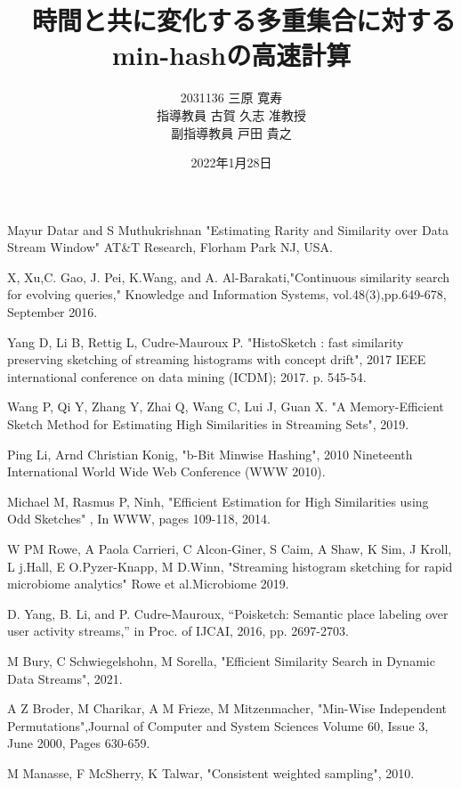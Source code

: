 \documentclass[a4paper,12pt,oneside,openany,dvipdfmx,report]{jsbook}
\title{\huge　時間と共に変化する多重集合に対するmin-hashの高速計算}
\author{2031136 三原 寛寿\\ 指導教員 古賀 久志 准教授\\  副指導教員  戸田 貴之}
\date{2022年1月28日}
\begin{document}
\maketitle
\large
\tableofcontents
\clearpage

\maketitle











\vspace{2em}

\begin{thebibliography}{99}
 Mayur Datar and S Muthukrishnan "Estimating Rarity and Similarity over Data Stream Window" AT\&T Research, Florham Park NJ, USA.

  X, Xu,C. Gao, J. Pei, K.Wang, and A. Al-Barakati,"Continuous similarity search for evolving queries," Knowledge and Information Systems, vol.48(3),pp.649-678, September 2016.

Yang D, Li B, Rettig L, Cudre-Mauroux P. "HistoSketch : fast similarity  preserving sketching of streaming histograms with concept drift", 2017 IEEE international conference on data mining (ICDM); 2017. p. 545-54.
        
Wang P, Qi Y, Zhang Y, Zhai Q, Wang C, Lui J, Guan X. "A Memory-Efficient Sketch Method for Estimating High Similarities in Streaming Sets",  2019.

Ping Li, Arnd Christian Konig, "b-Bit Minwise Hashing", 2010 Nineteenth International World Wide Web Conference (WWW 2010).

Michael M, Rasmus P, Ninh, "Efficient Estimation for High Similarities using Odd Sketches" , In WWW, pages 109-118, 2014.

W PM Rowe, A Paola Carrieri, C Alcon-Giner, S Caim, A Shaw, K Sim, J Kroll, L j.Hall, E O.Pyzer-Knapp, M D.Winn, "Streaming histogram sketching for rapid microbiome analytics" Rowe et al.Microbiome 2019.

D. Yang, B. Li, and P. Cudre-Mauroux, “Poisketch: Semantic place labeling over user activity streams,” in Proc. of IJCAI, 2016, pp. 2697-2703.

M Bury, C Schwiegelshohn, M Sorella, "Efficient Similarity Search in Dynamic Data Streams", 2021.

A Z Broder, M Charikar, A M Frieze, M Mitzenmacher, "Min-Wise Independent Permutations",Journal of Computer and System Sciences Volume 60, Issue 3, June 2000, Pages 630-659.


M Manasse, F McSherry, K Talwar, "Consistent weighted sampling", 2010.

\end{thebibliography}
\end{document}

